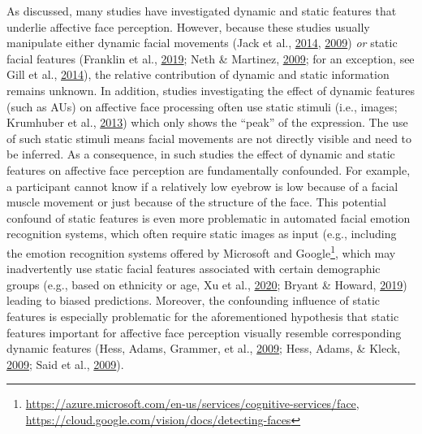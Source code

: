 \documentclass[11pt,american,a4paper,oneside,]{memoir} %
\let\rmarkdownfootnote\footnote%
\def\footnote{\protect\rmarkdownfootnote}
\begin{document}
As discussed, many studies have investigated dynamic and static features that underlie affective face perception. However, because these studies usually manipulate either dynamic facial movements (Jack et al., \protect\hyperlink{ref-Jack2014-ku}{2014}, \protect\hyperlink{ref-Jack2009-yy}{2009}) \emph{or} static facial features (Franklin et al., \protect\hyperlink{ref-Franklin2019-qo}{2019}; Neth \& Martinez, \protect\hyperlink{ref-Neth2009-eh}{2009}; for an exception, see Gill et al., \protect\hyperlink{ref-Gill2014-hx}{2014}), the relative contribution of dynamic and static information remains unknown. In addition, studies investigating the effect of dynamic features (such as AUs) on affective face processing often use static stimuli (i.e., images; Krumhuber et al., \protect\hyperlink{ref-Krumhuber2013-qi}{2013}) which only shows the ``peak'' of the expression. The use of such static stimuli means facial movements are not directly visible and need to be inferred. As a consequence, in such studies the effect of dynamic and static features on affective face perception are fundamentally confounded. For example, a participant cannot know if a relatively low eyebrow is low because of a facial muscle movement or just because of the structure of the face. This potential confound of static features is even more problematic in automated facial emotion recognition systems, which often require static images as input (e.g., including the emotion recognition systems offered by Microsoft and Google\footnote{\url{https://azure.microsoft.com/en-us/services/cognitive-services/face}, \url{https://cloud.google.com/vision/docs/detecting-faces}}, which may inadvertently use static facial features associated with certain demographic groups (e.g., based on ethnicity or age, Xu et al., \protect\hyperlink{ref-Xu2020-jd}{2020}; Bryant \& Howard, \protect\hyperlink{ref-Bryant2019-sg}{2019}) leading to biased predictions. Moreover, the confounding influence of static features is especially problematic for the aforementioned hypothesis that static features important for affective face perception visually resemble corresponding dynamic features (Hess, Adams, Grammer, et al., \protect\hyperlink{ref-Hess2009-jz}{2009}; Hess, Adams, \& Kleck, \protect\hyperlink{ref-Hess2009-xo}{2009}; Said et al., \protect\hyperlink{ref-Said2009-tf}{2009}).
\end{document}
